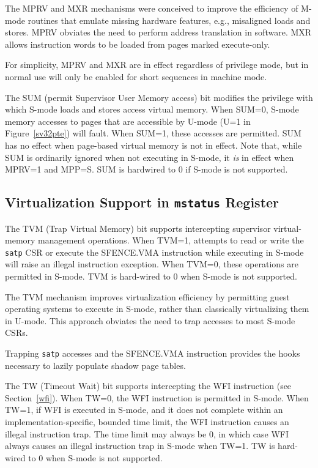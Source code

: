 \begin{commentary}
The MPRV and MXR mechanisms were conceived to improve the efficiency of M-mode
routines that emulate missing hardware features, e.g., misaligned loads and
stores.  MPRV obviates the need to perform address translation in software.
MXR allows instruction words to be loaded from pages marked execute-only.

For simplicity, MPRV and MXR are in effect regardless of privilege
mode, but in normal use will only be enabled for short sequences in
machine mode.
\end{commentary}

The SUM (permit Supervisor User Memory access) bit modifies the privilege with
which S-mode loads and stores access virtual memory.
When SUM=0, S-mode memory accesses to pages that are accessible by U-mode (U=1
in Figure~\ref{sv32pte}) will fault.  When SUM=1, these accesses are
permitted.  SUM has no effect when page-based virtual memory is not in effect.
Note that, while SUM is ordinarily ignored when not executing in S-mode, it
{\em is} in effect when MPRV=1 and MPP=S.  SUM is hardwired to 0 if S-mode is
not supported.

\subsection{Virtualization Support in {\tt mstatus} Register}
\label{virt-control}

The TVM (Trap Virtual Memory) bit supports intercepting
supervisor virtual-memory management operations.  When TVM=1,
attempts to read or write the {\tt satp} CSR or execute the SFENCE.VMA
instruction while executing in S-mode will raise an illegal instruction
exception.  When TVM=0, these operations are permitted in S-mode.
TVM is hard-wired to 0 when S-mode is not supported.

\begin{commentary}
The TVM mechanism improves virtualization efficiency by permitting guest
operating systems to execute in S-mode, rather than classically virtualizing
them in U-mode.  This approach obviates the need to trap accesses to most
S-mode CSRs.

Trapping {\tt satp} accesses and the SFENCE.VMA instruction provides the
hooks necessary to lazily populate shadow page tables.
\end{commentary}

The TW (Timeout Wait) bit supports intercepting the WFI instruction (see
Section~\ref{wfi}).  When TW=0, the WFI instruction is permitted in S-mode.
When TW=1, if WFI is executed in S-mode, and it does not complete within an
implementation-specific, bounded time limit, the WFI instruction causes an
illegal instruction trap.  The time limit may always be 0, in which case WFI
always causes an illegal instruction trap in S-mode when TW=1.
TW is hard-wired to 0 when S-mode is not supported.

